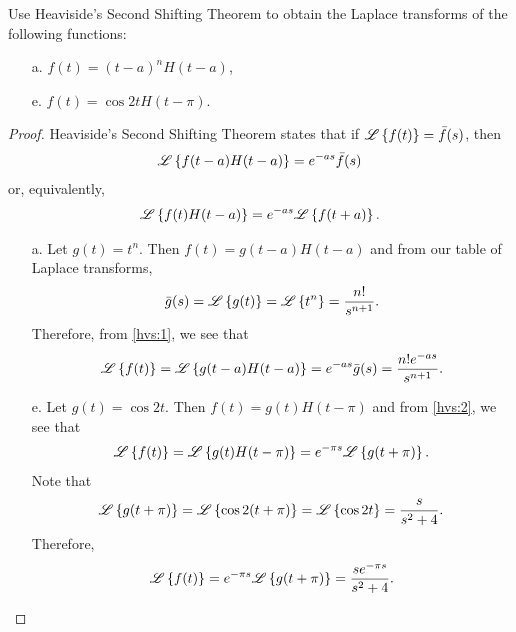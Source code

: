 \begin{problem}{3.32}
  Use Heaviside's Second Shifting Theorem to obtain the Laplace transforms of the
  following functions:
  \begin{enumerate}
    \item[a.] $f(t) = (t-a)^n H(t-a)$,
    \item[e.] $f(t) = \cos 2t H(t-\pi)$.
  \end{enumerate}
\end{problem}

\begin{proof}
  Heaviside's Second Shifting Theorem states that if $\mathscr{L}\left\{ {f(t)} \right\} = \bar{f}(s)$, then
  \begin{align}
    \mathscr{L}\left\{ {f(t-a)H(t - a)} \right\} = e^{-as}\bar{f}(s) \label{hvs:1}
  \end{align}
  or, equivalently,
  \begin{align}
    \mathscr{L}\left\{ {f(t)H(t - a)} \right\} = e^{-as}\mathscr{L}\left\{ {f(t+a)} \right\} \label{hvs:2}.
  \end{align}
  \begin{enumerate}
    \item[a.] Let $g(t) = t^n$. Then $f(t) = g(t-a)H(t-a)$ and from our table
      of Laplace transforms,
      \begin{align*}
        \bar{g}(s) = \mathscr{L}\left\{ {g(t)} \right\} = \mathscr{L}\left\{ {t^n} \right\} = \frac{n!}{s^{n+1}}.
      \end{align*}
      Therefore, from \eqref{hvs:1}, we see that
      \begin{align*}
        \mathscr{L}\left\{ {f(t)} \right\} = \mathscr{L}\left\{ {g(t-a)H(t-a)} \right\} = e^{-as}\bar{g}(s) = \frac{n!e^{-as}}{s^{n+1}}.
      \end{align*}
    \item[e.] Let $g(t) = \cos 2t$. Then $f(t) = g(t)H(t-\pi)$ and from
      \eqref{hvs:2}, we see that
      \begin{align*}
        \mathscr{L}\left\{ {f(t)} \right\} = \mathscr{L}\left\{ {g(t)H(t-\pi)} \right\} = e^{-\pi s} \mathscr{L}\left\{ {g(t+\pi)} \right\}.
      \end{align*}
      Note that
      \begin{align*}
        \mathscr{L}\left\{ {g(t+\pi)} \right\} = \mathscr{L}\left\{ {\cos 2(t+\pi)} \right\} = \mathscr{L}\left\{ {\cos 2 t} \right\} = \frac{s}{s^2+4}.
      \end{align*}
      Therefore,
      \begin{align*}
        \mathscr{L}\left\{ {f(t)} \right\} = e^{-\pi s} \mathscr{L}\left\{ {g(t+\pi)} \right\} = \frac{se^{-\pi s}}{s^2+4}.
      \end{align*}
  \end{enumerate}

\end{proof}
\newpage
